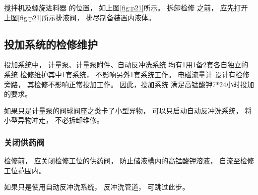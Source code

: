 \documentclass[UTF8,a4paper,12pt,titlepage]{ctexart}
\begin{document}
            \par 搅拌机及螺旋进料器 的位置，
            如上图\ref{fig:p21}所示。
            拆卸检修 之前，
            应先打开上图\ref{fig:p21}所示排液阀，
            排尽制备装置内液体。

   \subsection{投加系统的检修维护}
        投加系统中，
        计量泵、计量泵附件、自动反冲洗系统
        均有1用1备2套各自独立的系统
        检修维护其中1套系统，
        不影响另外1套系统工作。
        电磁流量计 设计有检修旁路，
        其检修不影响正常投加工作。
        因此，投加系统 满足高锰酸钾7*24小时投加的要求。
        \par 如果只是计量泵的阀球阀座之类卡了小型异物，
        可以只启动自动反冲洗系统，
        将小型异物冲走，
        不必拆卸维修。

        \subsubsection{关闭供药阀}
            检修前，
            应关闭检修工位的供药阀，
            防止储液槽内的高锰酸钾溶液，
            自流至检修工位范围内。
            \par 如果只是使用自动反冲洗系统，
            反冲洗管道，
            可跳过此步。
            
\end{document}
